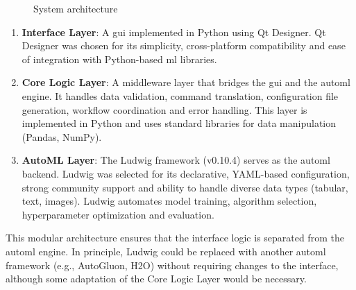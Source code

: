 \documentclass[twoside,final]{Contexto}
\begin{document}
\begin{figure}[H]
{
}
\caption{System architecture}
\label{fig:system_architecture}
\end{figure}

\begin{enumerate}
    \item \textbf{Interface Layer}: A \gls{gui} implemented in Python using Qt Designer. Qt Designer was chosen for its simplicity, cross-platform compatibility and ease of integration with Python-based \gls{ml} libraries.

    \item \textbf{Core Logic Layer}: A middleware layer that bridges the \gls{gui} and the \gls{automl} engine. It handles data validation, command translation, configuration file generation, workflow coordination and error handling. This layer is implemented in Python and uses standard libraries for data manipulation (Pandas, NumPy).

    \item \textbf{AutoML Layer}: The Ludwig framework (v0.10.4) serves as the \gls{automl} backend. Ludwig was selected for its declarative, YAML-based configuration, strong community support and ability to handle diverse data types (tabular, text, images). Ludwig automates model training, algorithm selection, hyperparameter optimization and evaluation.
\end{enumerate}

This modular architecture ensures that the interface logic is separated from the \gls{automl} engine. In principle, Ludwig could be replaced with another \gls{automl} framework (e.g., AutoGluon, H2O) without requiring changes to the interface, although some adaptation of the Core Logic Layer would be necessary.
\end{document}
